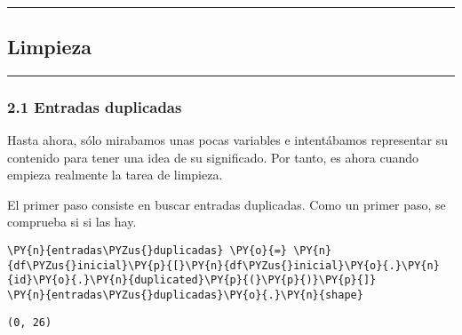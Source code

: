     \begin{center}
    \end{center}
    { \hspace*{\fill} \\}
    
    \begin{center}\rule{0.5\linewidth}{0.5pt}\end{center}

\hypertarget{limpieza}{%
\subsection{Limpieza}\label{limpieza}}

\begin{center}\rule{0.5\linewidth}{0.5pt}\end{center}

\hypertarget{entradas-duplicadas}{%
\subsubsection{2.1 Entradas duplicadas}\label{entradas-duplicadas}}

Hasta ahora, sólo mirabamos unas pocas variables e intentábamos
representar su contenido para tener una idea de su significado. Por
tanto, es ahora cuando empieza realmente la tarea de limpieza.

El primer paso consiste en buscar entradas duplicadas. Como un primer
paso, se comprueba si si las hay.

    \begin{tcolorbox}[breakable, size=fbox, boxrule=1pt, pad at break*=1mm,colback=cellbackground, colframe=cellborder]
\begin{Verbatim}[commandchars=\\\{\}]
\PY{n}{entradas\PYZus{}duplicadas} \PY{o}{=} \PY{n}{df\PYZus{}inicial}\PY{p}{[}\PY{n}{df\PYZus{}inicial}\PY{o}{.}\PY{n}{id}\PY{o}{.}\PY{n}{duplicated}\PY{p}{(}\PY{p}{)}\PY{p}{]}
\PY{n}{entradas\PYZus{}duplicadas}\PY{o}{.}\PY{n}{shape}
\end{Verbatim}
\end{tcolorbox}

            \begin{tcolorbox}[breakable, size=fbox, boxrule=.5pt, pad at break*=1mm, opacityfill=0]
\begin{Verbatim}[commandchars=\\\{\}]
(0, 26)
\end{Verbatim}
\end{tcolorbox}
        
